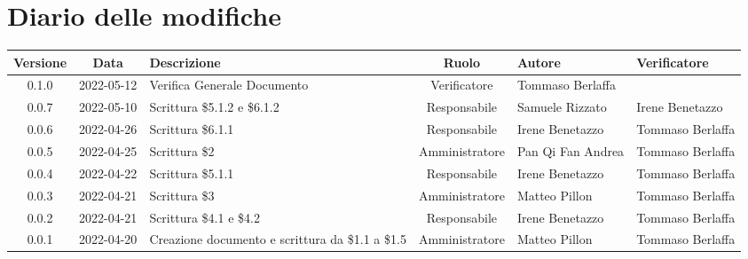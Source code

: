 \section*{Diario delle modifiche}
	\begin{center}
	\renewcommand{\arraystretch}{1.8} %
	\begin{tabular}{ |c|c|p{8em}|c|m{5em}|m{5em}| }
	\hline
	\textbf{Versione} & \textbf{Data} & \textbf{Descrizione} &  \textbf{Ruolo} &  \textbf{Autore} & \textbf{Verificatore}\\ %
	\hline %
	0.1.0 & 2022-05-12 & Verifica Generale Documento & Verificatore & Tommaso \newline Berlaffa  & \\
  \hline
	0.0.7 & 2022-05-10 & Scrittura \$5.1.2 e \$6.1.2 & Responsabile & Samuele \newline Rizzato & Irene \newline Benetazzo \\
	\hline
	0.0.6 & 2022-04-26 & Scrittura \$6.1.1 & Responsabile & Irene \newline Benetazzo & Tommaso \newline Berlaffa\\
	\hline 
	0.0.5& 2022-04-25 & Scrittura \$2 & Amministratore & Pan Qi Fan \newline Andrea & Tommaso \newline Berlaffa\\
	\hline
	0.0.4 & 2022-04-22 & Scrittura \$5.1.1 & Responsabile & Irene \newline Benetazzo & Tommaso \newline Berlaffa\\
	\hline 
	0.0.3 & 2022-04-21 & Scrittura \$3 & Amministratore & Matteo \newline Pillon & Tommaso \newline Berlaffa\\
	\hline
	0.0.2 & 2022-04-21 & Scrittura \newline \$4.1 e \$4.2 & Responsabile & Irene \newline Benetazzo & Tommaso \newline Berlaffa\\
	\hline
    0.0.1 & 2022-04-20 & Creazione documento e scrittura \newline da \$1.1 a \$1.5 & Amministratore & Matteo \newline Pillon & Tommaso \newline Berlaffa \\ 
	\hline
	\end{tabular}
	\end{center}
	\newpage